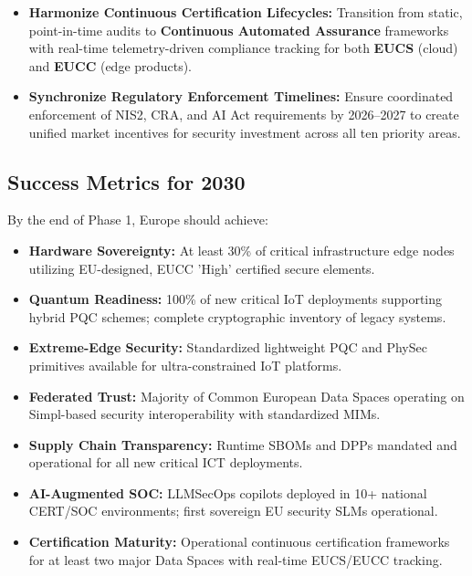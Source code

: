 \documentclass[12pt,a4paper]{report}
\begin{document}
\begin{itemize}
    \item \textbf{Harmonize Continuous Certification Lifecycles:} Transition from static, point-in-time audits to \textbf{Continuous Automated Assurance} frameworks with real-time telemetry-driven compliance tracking for both \textbf{EUCS} (cloud) and \textbf{EUCC} (edge products).
    
    \item \textbf{Synchronize Regulatory Enforcement Timelines:} Ensure coordinated enforcement of NIS2, CRA, and AI Act requirements by 2026--2027 to create unified market incentives for security investment across all ten priority areas.
\end{itemize}

\subsection*{Success Metrics for 2030}
By the end of Phase 1, Europe should achieve:
\begin{itemize}
    \item \textbf{Hardware Sovereignty:} At least 30\% of critical infrastructure edge nodes utilizing EU-designed, EUCC 'High' certified secure elements.
    \item \textbf{Quantum Readiness:} 100\% of new critical IoT deployments supporting hybrid PQC schemes; complete cryptographic inventory of legacy systems.
    \item \textbf{Extreme-Edge Security:} Standardized lightweight PQC and PhySec primitives available for ultra-constrained IoT platforms.
    \item \textbf{Federated Trust:} Majority of Common European Data Spaces operating on Simpl-based security interoperability with standardized MIMs.
    \item \textbf{Supply Chain Transparency:} Runtime SBOMs and DPPs mandated and operational for all new critical ICT deployments.
    \item \textbf{AI-Augmented SOC:} LLMSecOps copilots deployed in 10+ national CERT/SOC environments; first sovereign EU security SLMs operational.
    \item \textbf{Certification Maturity:} Operational continuous certification frameworks for at least two major Data Spaces with real-time EUCS/EUCC tracking.
\end{itemize}

\end{document}
